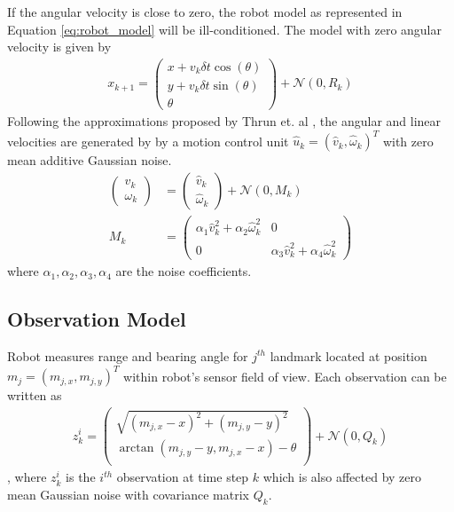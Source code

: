 \documentclass[conference]{IEEEtran}
\begin{document}
If the angular velocity is close to zero, the robot model as represented in Equation \ref{eq:robot_model} will be ill-conditioned. The model with zero angular velocity is given by 
\begin{align}
x_{k+1} = 
\begin{pmatrix}
x+v_k\delta t \cos(\theta) \\
y+v_k\delta t \sin(\theta)\\
\theta
\end{pmatrix}+ \mathcal{N}(0,R_k) \label{eq:robot_model}
\end{align}
Following the approximations proposed by Thrun et. al \cite{thrun2005probabilistic}, the angular and linear velocities are generated by by a motion control unit $\hat{u}_k = (\hat{v}_k,\hat{\omega}_k)^T$ with zero mean additive Gaussian noise.
\begin{align}
\begin{pmatrix}
v_k\\
\omega_k
\end{pmatrix} & =
\begin{pmatrix}
\hat{v}_k\\
\hat{\omega}_k
\end{pmatrix}+
\mathcal{N}(0,M_k) \\
M_k & = 
\begin{pmatrix}
\alpha_1 \hat{v}_k^2 + \alpha_2 \hat{\omega}_k^2 &  0\\
0 & \alpha_3 \hat{v}_k^2 + \alpha_4 \hat{\omega}_k^2
\end{pmatrix}
\end{align}
where $\alpha_1,\alpha_2,\alpha_3,\alpha_4$ are the noise coefficients. 


\subsection{Observation Model} Robot measures range and bearing angle for $j^{th}$ landmark located at position $m_j = (m_{j,x},m_{j,y})^T$ within robot's sensor field of view. Each observation can be written as
\begin{align}
z^i_k = 
\begin{pmatrix}
\sqrt{(m_{j,x}-x)^2+(m_{j,y}-y)^2}\\
\arctan(m_{j,y}-y,m_{j,x}-x)-\theta \\
\end{pmatrix}+\mathcal{N}(0,Q_k)
\end{align}
, where $z^i_k$ is the $i^{th}$ observation at time step $k$ which is also affected by zero mean Gaussian noise with covariance matrix $Q_k$. 
\end{document}
